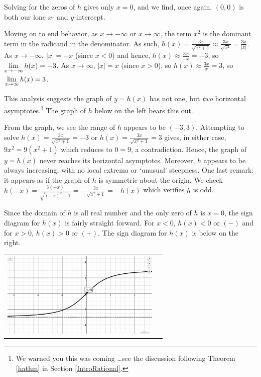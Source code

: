 \documentclass{ximera}
\begin{document}
\begin{ex}
\begin{enumerate}
Solving for the zeros of $h$ gives only $x = 0$, and we find, once again, $(0,0)$ is both our lone $x$- and $y$-intercept.  

Moving on to end behavior, as $x \rightarrow -\infty$ or  $x \rightarrow \infty$, the term $x^2$ is the dominant term in the radicand in the denominator. As such, $h(x) = \frac{3x}{\sqrt{x^2 + 1}} \approx \frac{3x}{\sqrt{x^2}} = \frac{3x}{|x|}$.  As $x \rightarrow -\infty$, $|x| = -x$ (since $x<0$) and hence, $h(x)\approx  \frac{3x}{-x} = -3$, so $\ds{\lim_{x \rightarrow -\infty} h(x) =  -3}$.   As $x \rightarrow \infty$, $|x| = x$ (since $x>0$), so $h(x) \approx \frac{3x}{x} = 3$, so $\ds{\lim_{x \rightarrow \infty} h(x) =  3}$. 
 
  This analysis suggests the graph of $y=h(x)$ has not one, but \textit{two} horizontal asymptotes.\footnote{We warned you this was coming \ldots see the discussion following Theorem \ref{hathm} in Section \ref{IntroRational}.} The graph of $h$ below on the left bears this out.

From the graph, we see the range of $h$ appears to be $(-3,3)$.  Attempting to solve $h(x) = \frac{3x}{\sqrt{x^2 + 1}} = -3$ or  $h(x) = \frac{3x}{\sqrt{x^2 + 1}} = 3$ gives, in either case, $9x^2 = 9(x^2+1)$ which reduces to $0 = 9$, a contradiction.  Hence, the graph of $y = h(x)$ never reaches its horizontal asymptotes. Moreover, $h$ appears to be always increasing, with no local extrema or `unusual' steepness.  One last remark:  it appears as if the graph of $h$ is symmetric about the origin.  We check $h(-x) = \frac{3(-x)}{\sqrt{(-x)^2+1}} = - \frac{3x}{\sqrt{x^2 + 1}} = -h(x)$ which verifies $h$ is odd.

\smallskip

Since the domain of $h$ is all real number and the only zero of $h$ is $x=0$, the sign diagram for $h(x)$ is fairly straight forward.  For $x<0$, $h(x)<0$ or $(-)$ and for $x>0$, $h(x) >0$ or $(+)$.  The sign diagram for $h(x)$ is below on the right.

\begin{center}

\begin{tabular}{cc}

\includegraphics[width=3in]{./RootRadicalFunctionsGraphics/RadicalGraphEx03.jpg} &


\end{tabular}
\end{center}
\end{enumerate}
\end{ex}
\end{document}

